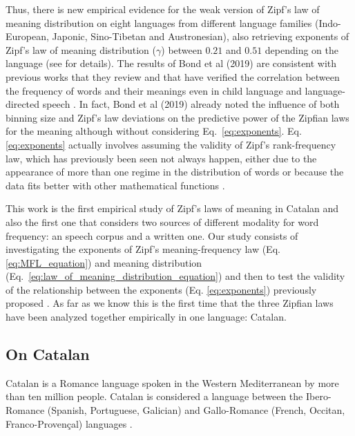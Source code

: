 \documentclass[10pt,letterpaper]{article}
\begin{document}
Thus, there is new empirical evidence for the weak version of Zipf’s law
of meaning distribution on eight languages from
different language families (Indo-European,
Japonic, Sino-Tibetan and Austronesian), also retrieving exponents of Zipf's law of meaning distribution ($\gamma$) between $0.21$ and $0.51$ depending on the language (see \cite{bond2019testing} for details).
The results of Bond et al (2019) \cite{bond2019testing} are consistent with previous works that they review and that have verified the correlation between the frequency of words and their meanings \cite{Baayen2005, Ilgen2007} even in child language and language-directed speech \cite{Casas2019, pilsen}. In fact, Bond et al (2019) already noted the influence of both binning size and Zipf's law deviations on the predictive power of the Zipfian laws for the meaning although without considering Eq.~\ref{eq:exponents}.
Eq. \ref{eq:exponents} actually involves assuming the validity of Zipf's rank-frequency law, which has previously been seen not always happen, either due to the appearance of more than one regime in the distribution of words \cite{ferrer2001two, MONTEMURRO2001, Williams2015} or because the data fits better with other mathematical functions \cite{MONTEMURRO2001, mandelbrot1966information, li2010fitting}. 

This work is the first empirical study of Zipf's laws of meaning in Catalan and also the first one that considers two sources of different modality for word frequency: an speech corpus and a written one. Our study consists of investigating the exponents of Zipf's meaning-frequency law (Eq. \ref{eq:MFL_equation}) and meaning distribution (Eq.~\ref{eq:law_of_meaning_distribution_equation}) and then to test the validity of the relationship between the exponents (Eq. \ref{eq:exponents}) previously proposed \cite{Ferrer2017, Ferrer2016}. As far as we know this is the first time that the three Zipfian laws have been analyzed together empirically in one language: Catalan.

\subsection*{On Catalan}

Catalan is a Romance language spoken in the Western Mediterranean by more than ten million people. 
Catalan is considered a language between the Ibero-Romance (Spanish, Portuguese, Galician) and Gallo-Romance (French, Occitan, Franco-Provençal) languages \cite{kabatek2011romance}. 
\end{document}
